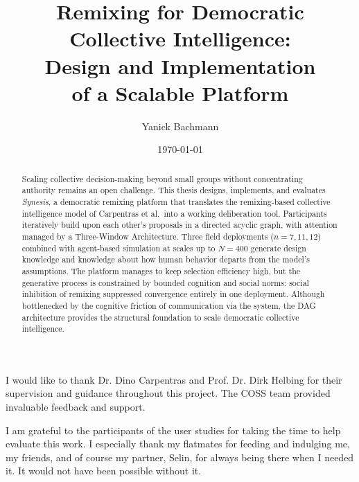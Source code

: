 \documentclass[a4paper, 12pt, twoside]{iviathesis}
\title{Remixing for Democratic\texorpdfstring{\\}{ }Collective Intelligence:\texorpdfstring{\\[0.2em]}{ }Design and Implementation\texorpdfstring{\\}{ }of a Scalable Platform}
\author{Yanick Bachmann}
\institute{Chair: Computational Social Science\\[2pt] 
ETH Zürich\\[1em] 
\textbf{Proposed Supervisors:} \ Prof. Dr. Dirk Helbing, Dr. Dino Carpentras}
\date{\today}
\begin{document}
\onehalfspacing

\frontmatter %
\maketitle 
\cleardoublepage

\begin{abstract} 
Scaling collective decision-making beyond small groups without concentrating authority remains an open challenge. This thesis designs, implements, and evaluates \textit{Synesis}, a democratic remixing platform that translates the remixing-based collective intelligence model of Carpentras et al.\ into a working deliberation tool. Participants iteratively build upon each other's proposals in a directed acyclic graph, with attention managed by a Three-Window Architecture. Three field deployments ($n = 7, 11, 12$) combined with agent-based simulation at scales up to $N = 400$ generate design knowledge and knowledge about how human behavior departs from the model's assumptions. The platform manages to keep selection efficiency high, but the generative process is constrained by bounded cognition and social norms: social inhibition of remixing suppressed convergence entirely in one deployment. Although bottlenecked by the cognitive friction of communication via the system, the DAG architecture provides the structural foundation to scale democratic collective intelligence.
\end{abstract}

\begin{acknowledgements}
I would like to thank Dr. Dino Carpentras and Prof. Dr. Dirk Helbing for their supervision and guidance throughout this project. The COSS team provided invaluable feedback and support.

I am grateful to the participants of the user studies for taking the time to help evaluate this work. I especially thank my flatmates for feeding and indulging me, my friends, and of course my partner, Selin, for always being there when I needed it. It would not have been possible without it.
\end{acknowledgements}
\end{document}
